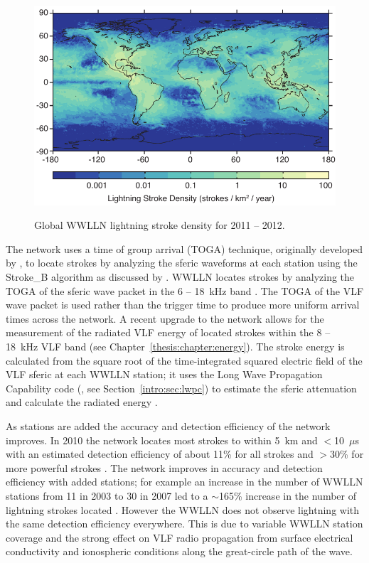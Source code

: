 \begin{figure}[ht!]
	\centering
	\includegraphics[scale=1]{Introduction/Figures/wwlln_density.pdf}\\
	\caption{Global WWLLN lightning stroke density for 2011 -- 2012.}
	\label{intro:fig:wwlln}
\end{figure}

The network uses a time of group arrival (TOGA) technique, originally developed by \citet{Dowden2002d}, to locate strokes by analyzing the sferic waveforms at each station using the Stroke\_B algorithm as discussed by \citet{Rodger2006,Rodger2009}.
WWLLN locates strokes by analyzing the TOGA of the sferic wave packet in the 6 -- 18~kHz band \citep{Dowden2000}.
The TOGA of the VLF wave packet is used rather than the trigger time to produce more uniform arrival times across the network.
A recent upgrade to the network allows for the measurement of the radiated VLF energy of located strokes within the 8 -- 18~kHz VLF band (see Chapter~\ref{thesis:chapter:energy}).
The stroke energy is calculated from the square root of the time-integrated squared electric field of the VLF sferic at each WWLLN station; it uses the Long Wave Propagation Capability code (\citet{Ferguson1998}, see Section~\ref{intro:sec:lwpc}) to estimate the sferic attenuation and calculate the radiated energy \citep{Hutchins2012}.

As stations are added the accuracy and detection efficiency of the network improves.
In 2010 the network locates most strokes to within 5~km and $<$10~$\mu$s with an estimated detection efficiency of about 11\% for all strokes and $>$30\% for more powerful strokes \citep{Abarca2010,Rodger2009}.
The network improves in accuracy and detection efficiency with added stations; for example an increase in the number of WWLLN stations from 11 in 2003 to 30 in 2007 led to a $\sim$165\% increase in the number of lightning strokes located \citep{Rodger2009}.
However the WWLLN does not observe lightning with the same detection efficiency everywhere.
This is due to variable WWLLN station coverage and the strong effect on VLF radio propagation from surface electrical conductivity and ionospheric conditions along the great-circle path of the wave.

